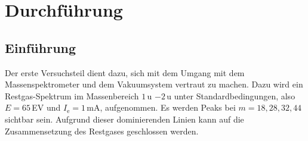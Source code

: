 \chapter{Durchführung}
\section{Einführung}
Der erste Versuchsteil dient dazu, sich mit dem Umgang mit dem Massenspektrometer und dem Vakuumsystem vertraut zu machen. Dazu wird ein Restgas-Spektrum im Massenbereich $1\,$u $-2\,$u unter Standardbedingungen, also $E=65\,$EV und $I_\text{e}=1\,$mA, aufgenommen. Es werden Peaks bei $m=18, 28, 32, 44$ sichtbar sein. Aufgrund dieser dominierenden Linien kann auf die Zusammensetzung des Restgases geschlossen werden. 